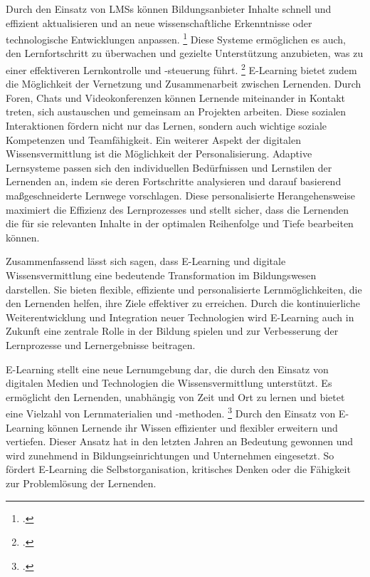 Durch den Einsatz von \acp{LMS} können Bildungsanbieter Inhalte schnell und effizient aktualisieren und an neue wissenschaftliche Erkenntnisse oder technologische Entwicklungen anpassen.
\footcite[Vgl.][22]{nedevaADVANTAGESELEARNINGENGLISH2010}
Diese Systeme ermöglichen es auch, den Lernfortschritt zu überwachen und gezielte Unterstützung anzubieten, was zu einer effektiveren Lernkontrolle und -steuerung führt.
\footcite[Vgl.][1]{zhangMoodogTrackingStudents2007}
E-Learning bietet zudem die Möglichkeit der Vernetzung und Zusammenarbeit zwischen Lernenden.
Durch Foren, Chats und Videokonferenzen können Lernende miteinander in Kontakt treten, sich austauschen und gemeinsam an Projekten arbeiten.
Diese sozialen Interaktionen fördern nicht nur das Lernen, sondern auch wichtige soziale Kompetenzen und Teamfähigkeit.
Ein weiterer Aspekt der digitalen Wissensvermittlung ist die Möglichkeit der Personalisierung.
Adaptive Lernsysteme passen sich den individuellen Bedürfnissen und Lernstilen der Lernenden an, indem sie deren Fortschritte analysieren und darauf basierend maßgeschneiderte Lernwege vorschlagen. Diese personalisierte Herangehensweise maximiert die Effizienz des Lernprozesses und stellt sicher, dass die Lernenden die für sie relevanten Inhalte in der optimalen Reihenfolge und Tiefe bearbeiten können.

Zusammenfassend lässt sich sagen, dass E-Learning und digitale Wissensvermittlung eine bedeutende Transformation im Bildungswesen darstellen.
Sie bieten flexible, effiziente und personalisierte Lernmöglichkeiten, die den Lernenden helfen, ihre Ziele effektiver zu erreichen.
Durch die kontinuierliche Weiterentwicklung und Integration neuer Technologien wird E-Learning auch in Zukunft eine zentrale Rolle in der Bildung spielen und zur Verbesserung der Lernprozesse und Lernergebnisse beitragen.

E-Learning stellt eine neue Lernumgebung dar, die durch den Einsatz von digitalen Medien und 
Technologien die Wissensvermittlung unterstützt. Es ermöglicht den Lernenden, unabhängig von Zeit und 
Ort zu lernen und bietet eine Vielzahl von Lernmaterialien und -methoden.
\footcite[Vgl.][1]{hosseindoostShiftTraditionalLearning2022}
Durch den Einsatz von E-Learning können Lernende ihr Wissen effizienter und flexibler erweitern und vertiefen.
Dieser Ansatz hat in den letzten Jahren an Bedeutung gewonnen und wird zunehmend in 
Bildungseinrichtungen und Unternehmen eingesetzt.
So fördert E-Learning die Selbstorganisation, kritisches
Denken oder die Fähigkeit zur Problemlösung der Lernenden. 

